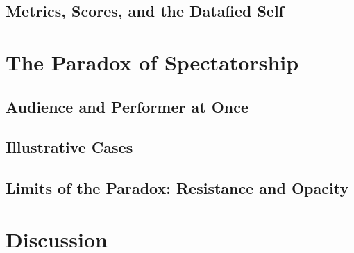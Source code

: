 \documentclass[11pt]{article}
\begin{document}
\subsection{Metrics, Scores, and the Datafied Self}

\section{The Paradox of Spectatorship}
\label{sec:paradox}

\subsection{Audience and Performer at Once}

\subsection{Illustrative Cases}

\subsection{Limits of the Paradox: Resistance and Opacity}

\section{Discussion}
\label{sec:discussion}

\end{document}
